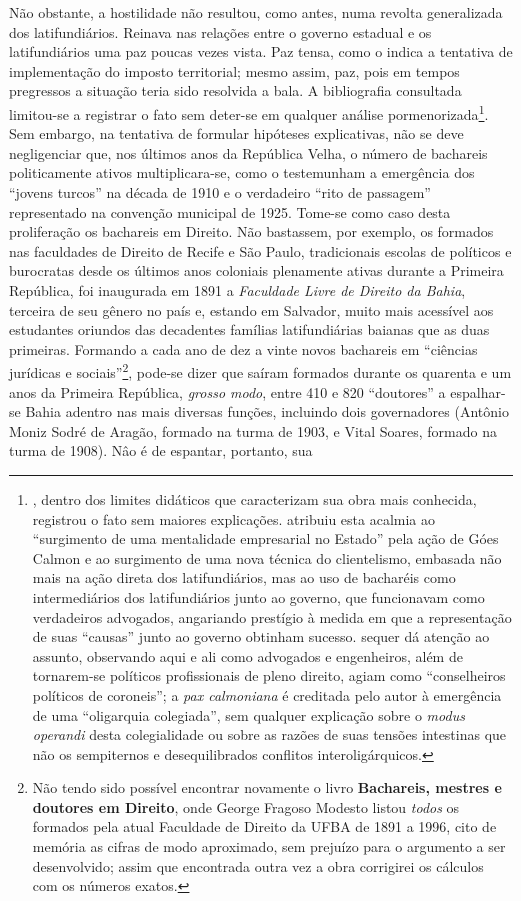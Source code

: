 Não obstante, a hostilidade não resultou, como antes, numa revolta generalizada dos latifundiários. Reinava nas relações entre o governo estadual e os latifundiários uma paz poucas vezes vista. Paz tensa, como o indica a tentativa de implementação do imposto territorial; mesmo assim, paz, pois em tempos pregressos a situação teria sido resolvida a bala. A bibliografia consultada limitou-se a registrar o fato sem deter-se em qualquer análise pormenorizada\footnote{, dentro dos limites didáticos que caracterizam sua obra mais conhecida, registrou o fato sem maiores explicações.  atribuiu esta acalmia ao ``surgimento de uma mentalidade empresarial no Estado'' pela ação de Góes Calmon e ao surgimento de uma nova técnica do clientelismo, embasada não mais na ação direta dos latifundiários, mas ao uso de bacharéis como intermediários dos latifundiários junto ao governo, que funcionavam como verdadeiros advogados, angariando prestígio à medida em que a representação de suas ``causas'' junto ao governo obtinham sucesso.  sequer dá atenção ao assunto, observando aqui e ali como advogados e engenheiros, além de tornarem-se políticos profissionais de pleno direito, agiam como ``conselheiros políticos de coroneis''; a \textit{pax calmoniana} é creditada pelo autor à emergência de uma ``oligarquia colegiada'', sem qualquer explicação sobre o \textit{modus operandi} desta colegialidade ou sobre as razões de suas tensões intestinas que não os sempiternos e desequilibrados conflitos interoligárquicos.}. Sem embargo, na tentativa de formular hipóteses explicativas, não se deve negligenciar que, nos últimos anos da República Velha, o número de bachareis politicamente ativos multiplicara-se, como o testemunham a emergência dos ``jovens turcos'' na década de 1910 e o verdadeiro ``rito de passagem'' representado na convenção municipal de 1925. Tome-se como caso desta proliferação os bachareis em Direito. Não bastassem, por exemplo, os formados nas faculdades de Direito de Recife e São Paulo, tradicionais escolas de políticos e burocratas desde os últimos anos coloniais plenamente ativas durante a Primeira República, foi inaugurada em 1891 a \textit{Faculdade Livre de Direito da Bahia}, terceira de seu gênero no país e, estando em Salvador, muito mais acessível aos estudantes oriundos das decadentes famílias latifundiárias baianas que as duas primeiras. Formando a cada ano de dez a vinte novos bachareis em ``ciências jurídicas e sociais''\footnote{Não tendo sido possível encontrar novamente o livro \textbf{Bachareis, mestres e doutores em Direito}, onde George Fragoso Modesto listou \textit{todos} os formados pela atual Faculdade de Direito da UFBA de 1891 a 1996, cito de memória as cifras de modo aproximado, sem prejuízo para o argumento a ser desenvolvido; assim que encontrada outra vez a obra corrigirei os cálculos com os números exatos.}, pode-se dizer que saíram formados durante os quarenta e um anos da Primeira República, \textit{grosso modo}, entre 410 e 820 ``doutores'' a espalhar-se Bahia adentro nas mais diversas funções, incluindo dois governadores (Antônio Moniz Sodré de Aragão, formado na turma de 1903, e Vital Soares, formado na turma de 1908). Nâo é de espantar, portanto, sua 